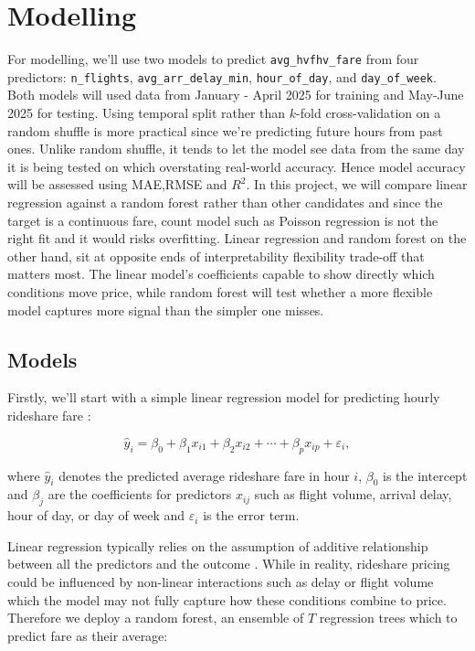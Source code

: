 \documentclass[11pt]{article}
\begin{document}
\FloatBarrier

\section{Modelling}

For modelling, we'll use two models to predict \texttt{avg\_hvfhv\_fare} from four
predictors: \texttt{n\_flights}, \texttt{avg\_arr\_delay\_min}, \texttt{hour\_of\_day},
and \texttt{day\_of\_week}. Both models
will used data from January - April 2025 for training and May-June 2025 for testing.
Using temporal split rather than $k$-fold cross-validation on a random shuffle is more
practical since we're predicting future hours from past ones. Unlike random shuffle, it
tends to let the model see data from the same day it is being tested on which
overstating real-world accuracy. Hence model accuracy will be assessed using
MAE,RMSE and $R^2$. In this project, we will compare linear regression against a
random forest rather than other candidates and since the target is a continuous fare,
count model such as Poisson regression is not the right fit and it would risks
overfitting. Linear regression and random forest on the other hand, sit at opposite
ends of interpretability flexibility trade-off that matters most. The linear model's
coefficients capable to show directly which conditions move price, while random forest
will test whether a more flexible model captures more signal than the simpler one
misses.

\subsection{Models}

Firstly, we'll start with a simple linear regression model for predicting hourly
rideshare fare \citep{seghouane2023linearregression}:

\begin{equation}
\hat{y}_i = \beta_0 + \beta_1 x_{i1} + \beta_2 x_{i2} + \cdots + \beta_p x_{ip} +
\varepsilon_i,
\label{eq:linear}
\end{equation}

where $\hat{y}_i$ denotes the predicted average rideshare fare in hour $i$, $\beta_0$
is the intercept and $\beta_j$ are the coefficients for predictors $x_{ij}$ such as
flight volume, arrival delay, hour of day, or day of week and $\varepsilon_i$ is the
error term.

Linear regression typically relies on the assumption of additive relationship between
all the predictors and the outcome \citep{seghouane2023linearregression}. While in
reality, rideshare pricing could be
influenced by non-linear interactions such as delay or flight volume which the model
may not fully capture how these conditions combine to price. Therefore we deploy a
random forest, an ensemble of $T$ regression trees which to predict fare as their
average:
\end{document}
